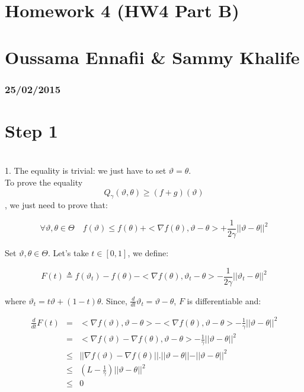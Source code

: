 


\geometry{hmargin=2.5cm,vmargin=2cm}   

	
	\section*{Homework 4 (HW4 Part B)}
	\section*{Oussama Ennafii \& Sammy Khalife}
	\subsubsection*{25/02/2015}

\section*{Step 1}
~\\

1. The equality is trivial: we just have to set $\vartheta=\theta$.\\

To prove the equality $$ Q_{\gamma}(\vartheta,\theta)\geq (f+g)(\vartheta)$$, we just need to prove that:

$$\forall \vartheta , \theta \in \Theta \quad f(\vartheta)\leq f(\theta)+<\nabla f(\theta),\vartheta-\theta>+\frac{1}{2\gamma}\vert\vert \vartheta-\theta\vert\vert^2$$

Set $ \vartheta , \theta \in \Theta$. Let's take $t \in [0,1]$, we define:

\begin{equation}
F(t) \triangleq f(\vartheta_t)-f(\theta)-<\nabla f(\theta),\vartheta_t-\theta>-\frac{1}{2\gamma}\vert\vert \vartheta_t-\theta\vert\vert^2
\end{equation}

where $\vartheta_t=t \vartheta+(1-t)\theta$. Since, $\frac{d}{dt}\vartheta_t=\vartheta-\theta$, $F$ is differentiable and:

\begin{eqnarray*}
	\frac{d}{dt}F(t)&=& <\nabla f(\vartheta), \vartheta-\theta> - <\nabla f(\theta), \vartheta-\theta>-\frac{1}{\gamma}\vert\vert \vartheta-\theta\vert\vert^2\\
						&=& <\nabla f(\vartheta)- \nabla f(\theta), \vartheta-\theta> -\frac{1}{\gamma}\vert\vert \vartheta-\theta\vert\vert^2\\
						&\leq& \vert\vert  \nabla f(\vartheta)- \nabla f(\theta)\vert \vert . \vert \vert \vartheta-\theta\vert \vert -\vert\vert \vartheta-\theta\vert\vert^2\\
						&\leq& (L-\frac{1}{\gamma})\vert\vert \vartheta-\theta\vert\vert^2\\
						&\leq& 0
\end{eqnarray*}

